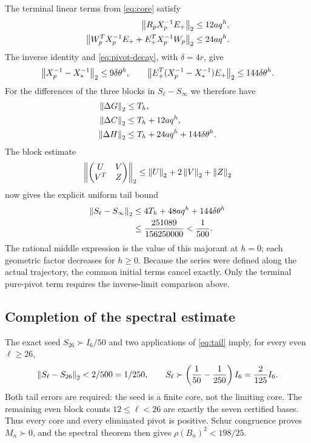 The terminal linear terms from \eqref{eq:core} satisfy
\begin{align*}
 \left\lVert R_pX_p^{-1}E_+\right\rVert_2&\le12a q^h,\\
 \left\lVert W_p^TX_p^{-1}E_++E_+^TX_p^{-1}W_p\right\rVert_2&\le24a q^h.
\end{align*}
The inverse identity and \eqref{eq:pivot-decay}, with $\delta=4r$,
give
\[
 \left\lVert X_p^{-1}-X_*^{-1}\right\rVert_2\le9\delta\theta^h,
 \qquad
 \left\lVert E_+^T(X_p^{-1}-X_*^{-1})E_+\right\rVert_2
 \le144\delta\theta^h.
\]
For the differences of the three blocks in $S_\ell-S_\infty$ we
therefore have
\begin{align*}
 \left\lVert\Delta G\right\rVert_2&\le T_h,\\
 \left\lVert\Delta C\right\rVert_2&\le T_h+12a q^h,\\
 \left\lVert\Delta H\right\rVert_2&\le T_h+24a q^h+144\delta\theta^h.
\end{align*}
The block estimate
\[
 \left\lVert\begin{pmatrix}U&V\\V^T&Z\end{pmatrix}\right\rVert_2
 \le\left\lVert U\right\rVert_2+2\left\lVert V\right\rVert_2+\left\lVert Z\right\rVert_2
\]
now gives the explicit uniform tail bound
\begin{align}
 \left\lVert S_\ell-S_\infty\right\rVert_2
 &\le4T_h+48a q^h+144\delta\theta^h\notag\\
 &\le\frac{251089}{156250000}<\frac1{500}.
 \label{eq:tail}
\end{align}
The rational middle expression is the value of this majorant at $h=0$;
each geometric factor decreases for $h\ge0$. Because the series were
defined along the actual trajectory, the common initial terms cancel
exactly. Only the terminal pure-pivot term requires the inverse-limit
comparison above.

\subsection{Completion of the spectral estimate}

The exact seed $S_{26}\succ I_6/50$ and two applications of
\eqref{eq:tail} imply, for every even $\ell\ge26$,
\[
 \left\lVert S_\ell-S_{26}\right\rVert_2<2/500=1/250,
 \qquad S_\ell\succ\left(\frac1{50}-\frac1{250}\right)I_6
                  =\frac2{125}I_6.
\]
Both tail errors are required: the seed is a finite core, not the limiting
core. The remaining even block counts $12\le\ell<26$ are exactly the
seven certified bases. Thus every core and every eliminated pivot is
positive. Schur congruence proves $M_n\succ0$, and the spectral theorem
then gives $\rho(B_n)^2<198/25$.

